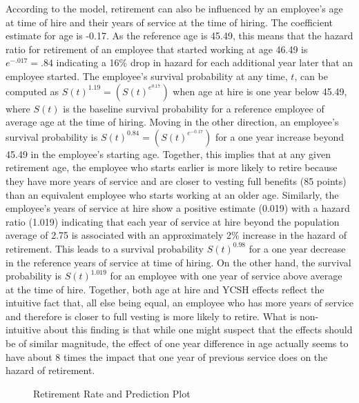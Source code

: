 According to the model, retirement can also be influenced by an employee's age at time of hire and their years of service at the time of hiring.  The coefficient estimate for age is -0.17. As the reference age is 45.49, this means that the hazard ratio for retirement of an employee that started working at age 46.49 is $e^{-.017}=.84$ indicating a 16\% drop in hazard for each additional year later that an employee started. The employee's survival probability at any time, $t$, can be computed as $S(t)^{1.19} = (S(t)^{e^{0.17}})$ when age at hire is one year below 45.49,  where $S(t)$ is the baseline survival probability for a reference employee of average age at the time of hiring. Moving in the other direction, an employee's survival probability is $S(t)^{0.84}=(S(t)^{e^{-0.17}})$ for a one year increase beyond 45.49 in the employee's starting age. Together, this implies that at any given retirement age, the employee who starts earlier is more likely to retire because they have more years of service and are closer to vesting full benefits (85 points) than an equivalent employee who starts working at an older age. Similarly, the employee's years of service at hire show a positive estimate (0.019) with a hazard ratio (1.019) indicating that each year of service at hire beyond the population average of 2.75 is associated with an approximately 2\% increase in the hazard of retirement.  This leads to a survival probability $S(t)^{0.98}$ for a one year decrease in the reference years of service at time of hiring.  On the other hand, the survival probability is $S(t)^{1.019}$ for an employee with one year of service above average at the time of hire. Together, both age at hire and YCSH effects reflect the intuitive fact that, all else being equal, an employee who has more years of service and therefore is closer to full vesting is more likely to retire.  What is non-intuitive about this finding is that while one might suspect that the effects should be of similar magnitude, the effect of one year difference in age actually seems to have about 8 times the impact that one year of previous service does on the hazard of retirement.

\begin{figure}[h!]
	\centering
	\caption{Retirement Rate and Prediction Plot}
	\label{fig:rerate}
\end{figure}


